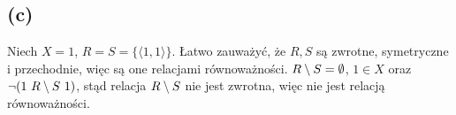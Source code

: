 \documentclass{article}
\begin{document}
\subsection*{(c)}
Niech $X = {1}$, $R=S=\{\langle 1,1 \rangle\}$. Łatwo zauważyć, że $R,S$ są zwrotne, symetryczne i przechodnie, więc są one relacjami równoważności. $R\setminus S = \emptyset$, $1 \in X$
 oraz \\ $\lnot(1 \  R\setminus S \ 1) $, stąd relacja $R\setminus S$ nie jest zwrotna, więc nie jest relacją równoważności.
\end{document}
